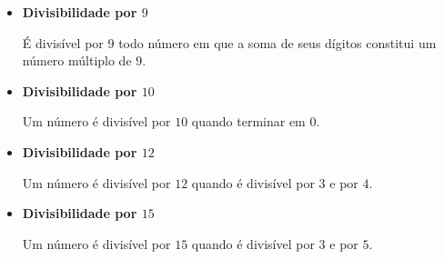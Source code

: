 \begin{itemize}
 \item \textbf{Divisibilidade por $9$}

 É divisível por $9$ todo número em que a soma de seus dígitos constitui um número múltiplo de $9$.

 \item \textbf{Divisibilidade por $10$}

 Um número é divisível por $10$ quando terminar em $0$.

 \item \textbf{Divisibilidade por $12$}

 Um número é divisível por $12$ quando é divisível por $3$ e por $4$.

 \item \textbf{Divisibilidade por $15$}

 Um número é divisível por $15$ quando é divisível por $3$ e por $5$.
 \end{itemize}